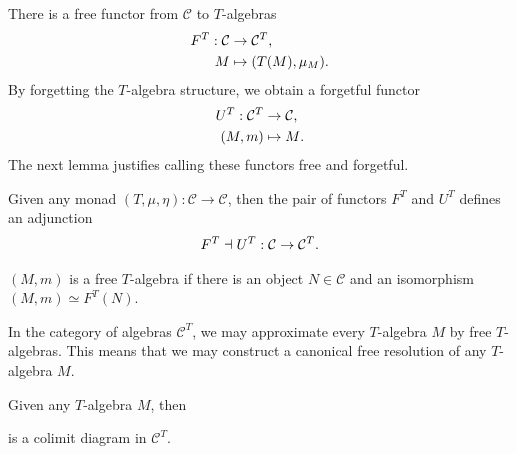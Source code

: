 \documentclass[../thesis.tex]{subfiles}
\begin{document}
        There is a free functor from $\mathcal{C}$ to $T$-algebras
        \begin{align*}
            F^T : \mathcal{C} & \rightarrow \mathcal{C}^T\tt{,} \\
            M & \mapsto (T(M), \mu_M)\tt{.}
        \end{align*}
        By forgetting the $T$-algebra structure, we obtain a forgetful functor
        \begin{align*}
            U^T : \mathcal{C}^T & \rightarrow \mathcal{C}\tt{,} \\
            (M, m) & \mapsto M\tt{.}
        \end{align*}
        The next lemma justifies calling these functors free and forgetful.        
        \begin{lemma}
            Given any monad $(T, \mu, \eta) : \mathcal{C} \rightarrow \mathcal{C}$, then the pair of functors $F^T$ and $U^T$ defines an adjunction
            \begin{align*}
                F^T \dashv U^T : \mathcal{C} \rightarrow \mathcal{C}^T\tt{.}
            \end{align*}
        \end{lemma}

        \begin{definition}
            $(M,m)$ is a free $T$-algebra if there is an object $N\in \mathcal{C}$ and an isomorphism $(M,m) \simeq F^T(N)$.
        \end{definition}
        In the category of algebras $\mathcal{C}^T$, we may approximate every $T$-algebra $M$ by free $T$-algebras. This means that we may construct a canonical free resolution of any $T$-algebra $M$.
        \begin{proposition}
            Given any $T$-algebra $M$, then
            \begin{center}
            \end{center}
            is a colimit diagram in $\mathcal{C}^T$.
        \end{proposition} 
\end{document}
